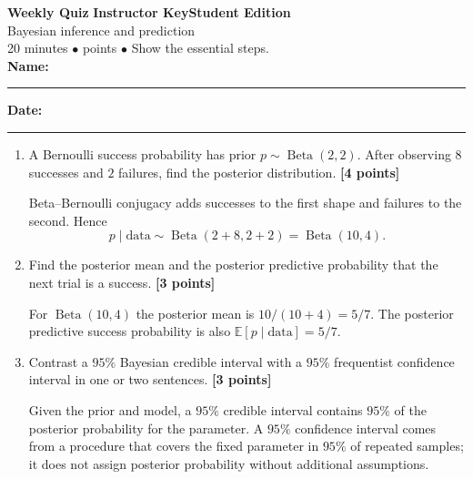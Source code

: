 \documentclass[11pt]{article}
\newcounter{quiznum}
\newcommand{\E}{\mathbb E}
\newcommand{\edition}{\ifanswers Instructor Key\else Student Edition\fi}
\newcommand{\points}[1]{\hfill{\small\color{rose}\textbf{[#1 points]}}}
\newcommand{\quizheading}[1]{%
  \clearpage\stepcounter{quiznum}%
  \begin{tcolorbox}[
    enhanced,colback=paper,colframe=indigo,boxrule=1.1pt,arc=2mm,
    left=4mm,right=4mm,top=2.5mm,bottom=2.5mm,
    borderline west={4pt}{0pt}{violet}]
    {\Large\bfseries\color{indigo}Weekly Quiz \thequiznum}\hfill
    {\bfseries\color{violet}\edition}\\[-1pt]
    {\large\color{ink}#1}\\[2pt]
    {\small\color{muted}20 minutes \quad $\bullet$ \quad 10 points \quad $\bullet$ \quad Show the essential steps.}
    \ifanswers\else
      \\[5pt]\textbf{Name:}\ \rule{0.48\linewidth}{0.4pt}\hfill
      \textbf{Date:}\ \rule{0.20\linewidth}{0.4pt}
    \fi
  \end{tcolorbox}
}
\begin{document}
\quizheading{Bayesian inference and prediction}
\begin{enumerate}
  \item A Bernoulli success probability has prior $p\sim\operatorname{Beta}(2,2)$.
  After observing $8$ successes and $2$ failures, find the posterior distribution.
  \points{4}
  \begin{solution}[1.25in]
    Beta--Bernoulli conjugacy adds successes to the first shape and failures to the
    second. Hence
    \[
      p\mid\text{data}\sim\operatorname{Beta}(2+8,2+2)
      =\operatorname{Beta}(10,4).
    \]
  \end{solution}

  \item Find the posterior mean and the posterior predictive probability that the
  next trial is a success. \points{3}
  \begin{solution}[1.15in]
    For $\operatorname{Beta}(10,4)$ the posterior mean is
    $10/(10+4)=5/7$. The posterior predictive success probability is also
    $\E[p\mid\text{data}]=5/7$.
  \end{solution}

  \item Contrast a $95\%$ Bayesian credible interval with a $95\%$ frequentist
  confidence interval in one or two sentences. \points{3}
  \begin{solution}[1.4in]
    Given the prior and model, a $95\%$ credible interval contains $95\%$ of the
    posterior probability for the parameter. A $95\%$ confidence interval comes
    from a procedure that covers the fixed parameter in $95\%$ of repeated samples;
    it does not assign posterior probability without additional assumptions.
  \end{solution}
\end{enumerate}
\end{document}

